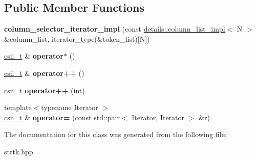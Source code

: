 \subsection*{Public Member Functions}
\begin{DoxyCompactItemize}
\item 
\hypertarget{classstrtk_1_1details_1_1column__selector__iterator__impl_a97eeab10ab785b897e0d090df7e5a9b7}{{\bfseries column\-\_\-selector\-\_\-iterator\-\_\-impl} (const \hyperlink{structstrtk_1_1details_1_1column__list__impl}{details\-::column\-\_\-list\-\_\-impl}$<$ N $>$ \&column\-\_\-list, iterator\-\_\-type(\&token\-\_\-list)\mbox{[}N\mbox{]})}\label{classstrtk_1_1details_1_1column__selector__iterator__impl_a97eeab10ab785b897e0d090df7e5a9b7}

\item 
\hypertarget{classstrtk_1_1details_1_1column__selector__iterator__impl_a446e250fa563f418c3175f744dcf0323}{\hyperlink{classstrtk_1_1details_1_1column__selector__iterator__impl}{csii\-\_\-t} \& {\bfseries operator$\ast$} ()}\label{classstrtk_1_1details_1_1column__selector__iterator__impl_a446e250fa563f418c3175f744dcf0323}

\item 
\hypertarget{classstrtk_1_1details_1_1column__selector__iterator__impl_a490201349a76e2a0878f6affb540efe2}{\hyperlink{classstrtk_1_1details_1_1column__selector__iterator__impl}{csii\-\_\-t} \& {\bfseries operator++} ()}\label{classstrtk_1_1details_1_1column__selector__iterator__impl_a490201349a76e2a0878f6affb540efe2}

\item 
\hypertarget{classstrtk_1_1details_1_1column__selector__iterator__impl_a11e1966cf9e1b1a3604a82e524cab7dd}{\hyperlink{classstrtk_1_1details_1_1column__selector__iterator__impl}{csii\-\_\-t} {\bfseries operator++} (int)}\label{classstrtk_1_1details_1_1column__selector__iterator__impl_a11e1966cf9e1b1a3604a82e524cab7dd}

\item 
\hypertarget{classstrtk_1_1details_1_1column__selector__iterator__impl_a4b83b5e3acdb2bb92c7f79e60c989de7}{{\footnotesize template$<$typename Iterator $>$ }\\\hyperlink{classstrtk_1_1details_1_1column__selector__iterator__impl}{csii\-\_\-t} \& {\bfseries operator=} (const std\-::pair$<$ Iterator, Iterator $>$ \&r)}\label{classstrtk_1_1details_1_1column__selector__iterator__impl_a4b83b5e3acdb2bb92c7f79e60c989de7}

\end{DoxyCompactItemize}


The documentation for this class was generated from the following file\-:\begin{DoxyCompactItemize}
\item 
strtk.\-hpp\end{DoxyCompactItemize}

